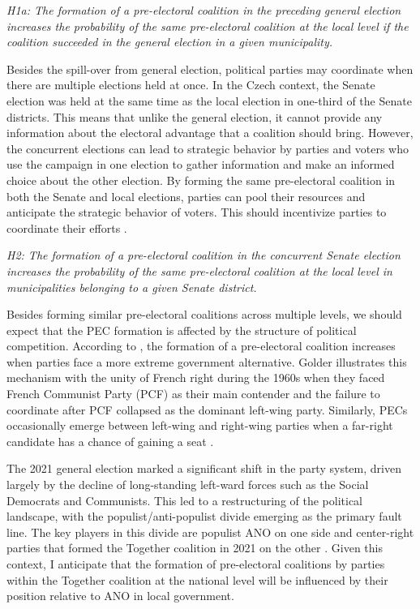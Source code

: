 \documentclass[]{interact}
\theoremstyle{plain}%
\theoremstyle{definition}
\theoremstyle{remark}
\begin{document}
\vspace{12pt}
\textit{H1a: The formation of a pre-electoral coalition in the preceding general election increases the probability of the same pre-electoral coalition at the local level if the coalition succeeded in the general election in a given municipality.\label{hyp:1.1}}
\vspace{12pt}

Besides the spill-over from general election, political parties may coordinate when there are multiple elections held at once. In the Czech context, the Senate election was held at the same time as the local election in one-third of the Senate districts. This means that unlike the general election, it cannot provide any information about the electoral advantage that a coalition should bring. However, the concurrent elections can lead to strategic behavior by parties and voters who use the campaign in one election to gather information and make an informed choice about the other election. By forming the same pre-electoral coalition in both the Senate and local elections, parties can pool their resources and anticipate the strategic behavior of voters. This should incentivize parties to coordinate their efforts \citep{hicken2011}. 

\vspace{12pt}
\textit{H2: The formation of a pre-electoral coalition in the concurrent Senate election increases the probability of the same pre-electoral coalition at the local level in municipalities belonging to a given Senate district.\label{hyp:2}}
\vspace{12pt}

Besides forming similar pre-electoral coalitions across multiple levels, we should expect that the PEC formation is affected by the structure of political competition. 
According to \citet{golder2006}, the formation of a pre-electoral coalition increases when parties face a more extreme government alternative. Golder illustrates this mechanism with the unity of French right during the 1960s when they faced French Communist Party (PCF) as their main contender and the failure to coordinate after PCF collapsed as the dominant left-wing party. Similarly, PECs occasionally emerge between left-wing and right-wing parties when a far-right candidate has a chance of gaining a seat \citep[73]{golder2006}. 

The 2021 general election marked a significant shift in the party system, driven largely by the decline of long-standing left-ward forces such as the Social Democrats and Communists. This led to a restructuring of the political landscape, with the populist/anti-populist divide emerging as the primary fault line. The key players in this
divide are populist ANO on one side and center-right parties that formed the Together coalition in 2021 on the other \citep{havlik2022}. Given this context, I anticipate that the formation of pre-electoral coalitions by parties within the Together coalition at the national level will be influenced by their position relative to ANO in local government.
\end{document}
